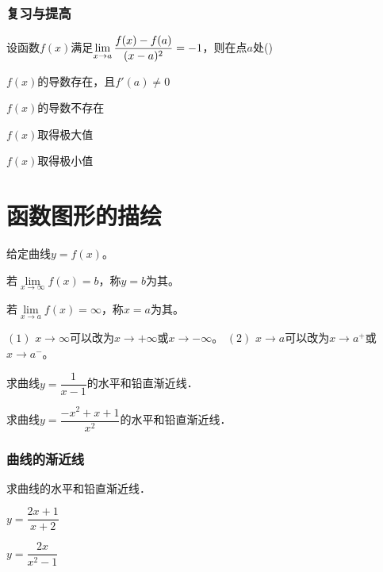 \documentclass[14pt,notheorems,leqno,xcolor={rgb}]{beamer} %
\begin{document}
\begin{frame}
\frametitle{复习与提高}
\begin{choice}
设函数$f(x)$满足$\lim\limits_{x\to a}\dfrac{f(x)-f(a)}{(x-a)^2}=-1$，则在点$a$处\dotfill(\qquad)
\begin{choiceline}
  \item $f(x)$的导数存在，且$f'(a)\neq0$
  \item $f(x)$的导数不存在
  \item $f(x)$取得极大值
  \item $f(x)$取得极小值
\end{choiceline}
\end{choice}%
\end{frame}

\section{函数图形的描绘}

\begin{frame}
\begin{definition}
给定曲线$y=f(x)$。
\begin{enumskip}
  \item 若$\lim\limits_{x\to\infty}f(x)=b$，称$y=b$为其。
  \item 若$\lim\limits_{x\to a}f(x)=\infty$，称$x=a$为其。
\end{enumskip}
\end{definition}
\vpause
\begin{remark*}
$(1)$ $x\to\infty$可以改为$x\to+\infty$或$x\to-\infty$。\pause
$(2)$ $x\to a$可以改为$x\to a^+$或$x\to a^-$。
\end{remark*}
\end{frame}

\begin{frame}
\begin{example}
求曲线$y=\dfrac1{x-1}$的水平和铅直渐近线．
\end{example}\pause
\begin{example}
求曲线$y=\dfrac{-x^2+x+1}{x^2}$的水平和铅直渐近线．
\end{example}
\end{frame}

\begin{frame}
\frametitle{曲线的渐近线}
\begin{exercise}
求曲线的水平和铅直渐近线．
\begin{enumhalf}
  \item $y=\dfrac{2x+1}{x+2}$ ~
  \item $y=\dfrac{2x}{x^2-1}$ ~
\end{enumhalf}
\end{exercise}
\end{frame}
\end{document}
